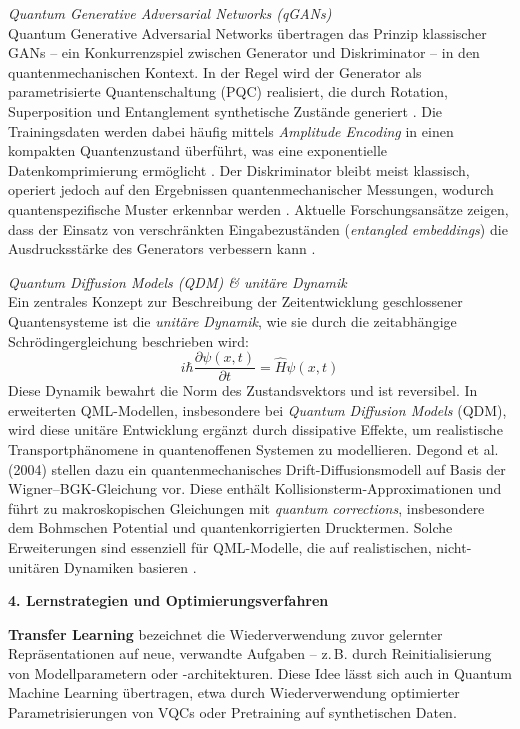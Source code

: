\vspace{0.2cm}
\noindent
\textit{Quantum Generative Adversarial Networks (qGANs)}\\
Quantum Generative Adversarial Networks übertragen das Prinzip klassischer GANs – ein Konkurrenzspiel zwischen Generator und Diskriminator – in den quantenmechanischen Kontext. In der Regel wird der Generator als parametrisierte Quantenschaltung (PQC) realisiert, die durch Rotation, Superposition und Entanglement synthetische Zustände generiert \cite{zoufal2019}. Die Trainingsdaten werden dabei häufig mittels \textit{Amplitude Encoding} in einen kompakten Quantenzustand überführt, was eine exponentielle Datenkomprimierung ermöglicht \cite{schuld2018}. Der Diskriminator bleibt meist klassisch, operiert jedoch auf den Ergebnissen quantenmechanischer Messungen, wodurch quantenspezifische Muster erkennbar werden \cite{braccia2021}. Aktuelle Forschungsansätze zeigen, dass der Einsatz von verschränkten Eingabezuständen (\textit{entangled embeddings}) die Ausdrucksstärke des Generators verbessern kann \cite{niu2022}.  

\vspace{0.2cm}
\noindent
\textit{Quantum Diffusion Models (QDM) \& unitäre Dynamik}\\
Ein zentrales Konzept zur Beschreibung der Zeitentwicklung geschlossener Quantensysteme ist die \textit{unitäre Dynamik}, wie sie durch die zeitabhängige Schrödingergleichung beschrieben wird:
\[
i\hbar \frac{\partial \psi(x, t)}{\partial t} = \hat{H} \psi(x, t)
\]
Diese Dynamik bewahrt die Norm des Zustandsvektors und ist reversibel. In erweiterten QML-Modellen, insbesondere bei \textit{Quantum Diffusion Models} (QDM), wird diese unitäre Entwicklung ergänzt durch dissipative Effekte, um realistische Transportphänomene in quantenoffenen Systemen zu modellieren. Degond et al. (2004) stellen dazu ein quantenmechanisches Drift-Diffusionsmodell auf Basis der Wigner–BGK-Gleichung vor. Diese enthält Kollisionsterm-Approximationen und führt zu makroskopischen Gleichungen mit \textit{quantum corrections}, insbesondere dem Bohmschen Potential und quantenkorrigierten Drucktermen. Solche Erweiterungen sind essenziell für QML-Modelle, die auf realistischen, nicht-unitären Dynamiken basieren \cite{degond2004}.  

\vspace{0.5cm}


\noindent\textbf{4. Lernstrategien und Optimierungsverfahren}  

\vspace{0.2cm}
\noindent
\textbf{Transfer Learning} bezeichnet die Wiederverwendung zuvor gelernter Repräsentationen auf neue, verwandte Aufgaben – z.\,B. durch Reinitialisierung von Modellparametern oder -architekturen. Diese Idee lässt sich auch in Quantum Machine Learning übertragen, etwa durch Wiederverwendung optimierter Parametrisierungen von VQCs oder Pretraining auf synthetischen Daten.

